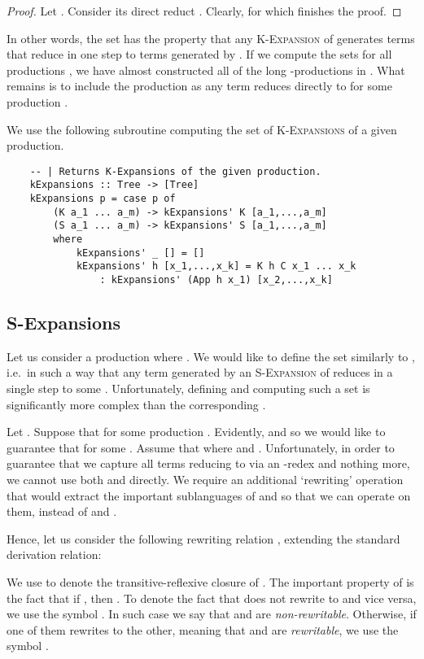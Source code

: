 \documentclass[11pt,a4paper]{amsart}
\theoremstyle{definition}
\begin{document}
\begin{proof}
    Let . Consider its direct reduct . Clearly,  for  which finishes the proof.
\end{proof}

In other words, the set  has the property that any \textsc{K-Expansion} of  generates terms that reduce in one step to terms generated by . If we compute the sets  for all productions , we have almost constructed all of the long -productions in . What remains is to include the production  as any term  reduces directly to  for some production .

We use the following subroutine computing the set of \textsc{K-Expansions} of a given production.

\begin{lstlisting}
    -- | Returns K-Expansions of the given production.
    kExpansions :: Tree -> [Tree]
    kExpansions p = case p of
        (K a_1 ... a_m) -> kExpansions' K [a_1,...,a_m]
        (S a_1 ... a_m) -> kExpansions' S [a_1,...,a_m]
        where
            kExpansions' _ [] = []
            kExpansions' h [x_1,...,x_k] = K h C x_1 ... x_k
                : kExpansions' (App h x_1) [x_2,...,x_k]
\end{lstlisting}

\subsection{S-Expansions}\label{sec:s-expansions}
Let us consider a production  where . We would like to define the set  similarly to , i.e.~in such a way that any term generated by an \textsc{S-Expansion} of  reduces in a single step to some . Unfortunately, defining and computing such a set is significantly more complex than the corresponding .

Let . Suppose that  for some production . Evidently,  and so we would like to guarantee that  for some . Assume that  where  and . Unfortunately, in order to guarantee that we capture all terms reducing to  via an -redex and nothing more, we cannot use both  and  directly. We require an additional `rewriting' operation that would extract the important sublanguages of  and  so that we can operate on them, instead of  and . 

Hence, let us consider the following rewriting relation , extending the standard derivation relation:



We use  to denote the transitive-reflexive closure of . The important property of  is the fact that if , then . To denote the fact that  does not rewrite to  and vice versa, we use the symbol . In such case we say that  and  are \emph{non-rewritable}. Otherwise, if one of them rewrites to the other, meaning that  and  are \emph{rewritable}, we use the symbol .
\end{document}
